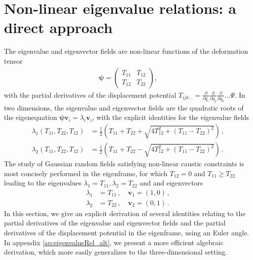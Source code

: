 \documentclass[a4paper, 11pt]{article}
\begin{document}
\section{Non-linear eigenvalue relations: a direct approach}\label{ap:eigenvalueRel}
The eigenvalue and eigenvector fields are non-linear functions of the deformation tensor
\begin{align}
\bm{\psi} = \begin{pmatrix} T_{11} & T_{12} \\ T_{12} & T_{22}\end{pmatrix},
\end{align}
with the partial derivatives of the displacement potential $T_{ijk\dots} = \frac{\partial}{\partial q_i}\frac{\partial}{\partial q_j}\frac{\partial}{\partial q_k}\dots \Psi$. In two dimensions, the eigenvalue and eigenvector fields are the quadratic roots of the eigenequation $\bm{\psi}\bm{v}_i=\lambda_i \bm{v}_i$, with the explicit identities for the eigenvalue fields
\begin{align}
\lambda_1(T_{11},T_{22},T_{12}) &= \frac{1}{2}\left(T_{11}+T_{22} + \sqrt{4 T_{12}^2 +(T_{11}-T_{22})^2}\right)\,,\label{eq:lambda_1}\\
\lambda_2(T_{11},T_{22},T_{12}) &= \frac{1}{2}\left(T_{11}+T_{22} - \sqrt{4 T_{12}^2 +(T_{11}-T_{22})^2}\right)\,.\label{eq:lambda_2}
\end{align}
The study of Gaussian random fields satisfying non-linear caustic constraints is most concisely performed in the eigenframe, for which $T_{12}=0$ and $T_{11} \geq T_{22}$ leading to the eigenvalues $\lambda_1=T_{11}, \lambda_2=T_{22}$ and and eigenvectors
\begin{align}
\lambda_{1} &= T_{11}\,,\quad \bm{v}_1=(1,0)\,,\\
\lambda_{2} &= T_{22}\,,\quad \bm{v}_2=(0,1)\,.
\end{align}
In this section, we give an explicit derivation of several identities relating to the partial derivatives of the eigenvalue and eigenvector fields and the partial derivatives of the displacement potential in the eigenframe, using an Euler angle. In appendix \ref{ap:eigenvalueRel_alt}, we present a more efficient algebraic derivation, which more easily generalizes to the three-dimensional setting.
\end{document}
